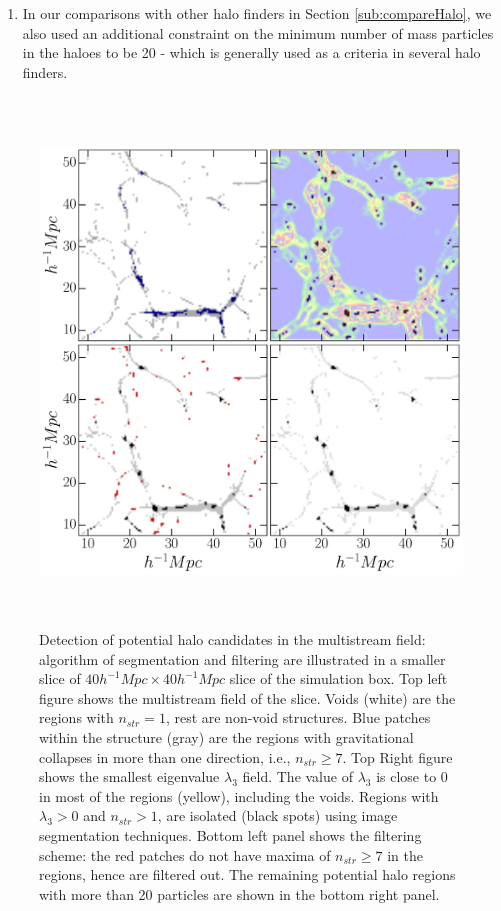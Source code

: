 {\begin{enumerate}
\item In our comparisons with other halo finders in Section \ref{sub:compareHalo}, we also used an additional constraint on the minimum number of mass particles in the haloes to be 20 - which is generally used as a criteria in several halo finders. 

\end{enumerate} 


\begin{figure}
\begin{minipage}[t]{0.99\linewidth}
 \centering\includegraphics[height=14cm]{Chapter5/Source_v2/fig3.pdf} 
\end{minipage}\hfill
\caption{ Detection of potential halo candidates in the multistream field: algorithm of segmentation and filtering are illustrated in a smaller slice of $40 h^{-1} Mpc \times 40 h^{-1} Mpc$ slice of the simulation box. Top left figure shows the multistream field of the slice. Voids (white) are the regions with $n_{str} =1$, rest are non-void structures. Blue patches within the structure (gray) are the regions with gravitational collapses in more than one direction, i.e., $n_{str} \geq 7$. Top Right figure shows the smallest eigenvalue $\lambda_3$ field. The value of $\lambda_3$ is close to 0 in most of the regions (yellow), including the voids. Regions with  $\lambda_3 > 0$ and $n_{str} > 1$, are isolated (black spots) using image segmentation techniques. Bottom left panel shows the filtering scheme: the red patches do not have maxima of $n_{str} \geq 7$ in the regions, hence are filtered out. The remaining potential halo regions with more than 20 particles are shown in the bottom right panel.}
\label{fig:labelsfilter}
\end{figure}

}
